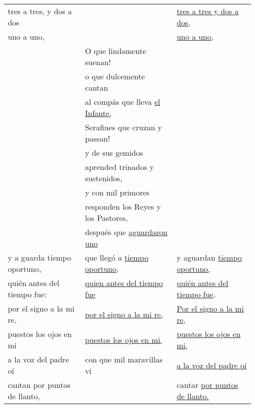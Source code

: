 \documentclass{aac-table}
\begin{document}
\begin{longtable}{lll}
    tres a tres, y dos a dos &
    &
    \uline{tres a tres y dos a dos,} \\

    uno a uno, &
    &
    \uline{uno a uno,} \\
    
    & 
    O que lindamente suenan! 
    & \\
    
    & 
    o que dulcemente cantan 
    & \\
    
    & 
    al compás que lleva \uline{el Infante,} 
    & \\
    
    & 
    Serafines que cruzan y passan! 
    & \\
    
    & 
    y de sus gemidos 
    & \\
    
    & 
    aprended trinados y sustenidos, 
    & \\
    
    & 
    y con mil primores 
    & \\ 
    
    & 
    responden los Reyes y los Pastores, 
    & \\
 
    & 
    después que \uline{aguardaron uno} 
    & \\

    y a guarda tiempo oportuno, &
    que llegó a \uline{tiempo oportuno}, &
    y aguardan \uline{tiempo oportuno,} \\ 
    
    quién antes del tiempo fue: &
    \uline{quien antes del tiempo fue} &
    \uline{quién antes del tiempo fue}. \\

    por el signo a la mi re, &
    \uline{por el signo a la mi re,} &
    \uline{Por el signo a la mi re,} \\

    puestos los ojos en mi &
    \uline{puestos los ojos en mi,} &
    \uline{puestos los ojos en mi,} \\

    a la voz del padre oí &
    con que mil maravillas vi &
    \uline{a la voz del padre oí} \\

    cantan por puntos de llanto, &
    &
    cantar \uline{por puntos de llanto.} \\


\end{longtable}
\end{document}
